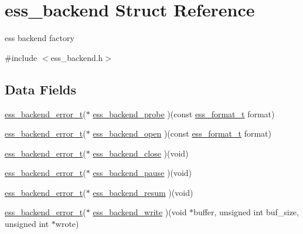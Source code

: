 \hypertarget{structess__backend}{}\section{ess\+\_\+backend Struct Reference}
\label{structess__backend}


ess backend factory  




{\ttfamily \#include $<$ess\+\_\+backend.\+h$>$}

\subsection*{Data Fields}
\begin{DoxyCompactItemize}
\item 
\hyperlink{ess__backend_8h_aa3de0496a3f361a6b38684e9cb65f01c}{ess\+\_\+backend\+\_\+error\+\_\+t}($\ast$ \hyperlink{structess__backend_aae4f1015dadb3ed79975c5b7b78e547f}{ess\+\_\+backend\+\_\+probe} )(const \hyperlink{ess__format_8h_ab03f24cb5d42f4448f713bf1ec178163}{ess\+\_\+format\+\_\+t} format)
\item 
\hyperlink{ess__backend_8h_aa3de0496a3f361a6b38684e9cb65f01c}{ess\+\_\+backend\+\_\+error\+\_\+t}($\ast$ \hyperlink{structess__backend_ae6dfe97715fbf9f3fbf7b46a2d311e64}{ess\+\_\+backend\+\_\+open} )(const \hyperlink{ess__format_8h_ab03f24cb5d42f4448f713bf1ec178163}{ess\+\_\+format\+\_\+t} format)
\item 
\hyperlink{ess__backend_8h_aa3de0496a3f361a6b38684e9cb65f01c}{ess\+\_\+backend\+\_\+error\+\_\+t}($\ast$ \hyperlink{structess__backend_a5bc22e85096f398b542b05d8b1e41308}{ess\+\_\+backend\+\_\+close} )(void)
\item 
\hyperlink{ess__backend_8h_aa3de0496a3f361a6b38684e9cb65f01c}{ess\+\_\+backend\+\_\+error\+\_\+t}($\ast$ \hyperlink{structess__backend_ad263ce89d932658c73be2e5863d0afcf}{ess\+\_\+backend\+\_\+pause} )(void)
\item 
\hyperlink{ess__backend_8h_aa3de0496a3f361a6b38684e9cb65f01c}{ess\+\_\+backend\+\_\+error\+\_\+t}($\ast$ \hyperlink{structess__backend_ab9a30f8d9f4bd941ae74e3ef0c9d7aa3}{ess\+\_\+backend\+\_\+resum} )(void)
\item 
\hyperlink{ess__backend_8h_aa3de0496a3f361a6b38684e9cb65f01c}{ess\+\_\+backend\+\_\+error\+\_\+t}($\ast$ \hyperlink{structess__backend_a3a1b32830c82ec84aa0e6c02280d7f6c}{ess\+\_\+backend\+\_\+write} )(void $\ast$buffer, unsigned int buf\+\_\+size, unsigned int $\ast$wrote)
\item 

\end{DoxyCompactItemize}

